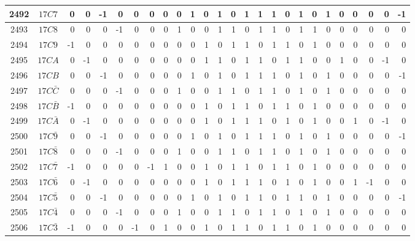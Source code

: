 \documentclass[12 pt]{article}%
\begin{document}
\begin{tiny}
\begin{centering}
\begin{longtable}{|c|c||rrrrrrrrrrrrrrrrrrrrrrrr|}
      \hline
      2492 & $17C7$ & 0 & 0 & -1 & 0 & 0 & 0 & 0 & 0 & 1 & 0 & 1 & 0 & 1 & 1 & 1 & 0 & 1 & 0 & 1 & 0 & 0 & 0 & 0 & -1 \\
      \hline
      2493 & $17C8$ & 0 & 0 & 0 & -1 & 0 & 0 & 0 & 1 & 0 & 0 & 1 & 1 & 0 & 1 & 1 & 0 & 1 & 1 & 0 & 0 & 0 & 0 & 0 & 0 \\
      \hline
      2494 & $17C9$ & -1 & 0 & 0 & 0 & 0 & 0 & 0 & 0 & 0 & 1 & 0 & 1 & 1 & 0 & 1 & 1 & 0 & 1 & 0 & 0 & 0 & 0 & 0 & 0 \\
      \hline
      2495 & $17CA$ & 0 & -1 & 0 & 0 & 0 & 0 & 0 & 0 & 0 & 1 & 1 & 0 & 1 & 1 & 0 & 1 & 1 & 0 & 0 & 1 & 0 & 0 & -1 & 0 \\
      \hline
      2496 & $17CB$ & 0 & 0 & -1 & 0 & 0 & 0 & 0 & 0 & 1 & 0 & 1 & 0 & 1 & 1 & 1 & 0 & 1 & 0 & 1 & 0 & 0 & 0 & 0 & -1 \\
      \hline
      2497 & $17C\bar C$ & 0 & 0 & 0 & -1 & 0 & 0 & 0 & 1 & 0 & 0 & 1 & 1 & 0 & 1 & 1 & 0 & 1 & 0 & 1 & 0 & 0 & 0 & 0 & 0 \\
      \hline
      2498 & $17C\bar B$ & -1 & 0 & 0 & 0 & 0 & 0 & 0 & 0 & 0 & 1 & 0 & 1 & 1 & 0 & 1 & 1 & 0 & 1 & 0 & 0 & 0 & 0 & 0 & 0 \\
      \hline
      2499 & $17C\bar A$ & 0 & -1 & 0 & 0 & 0 & 0 & 0 & 0 & 0 & 1 & 0 & 1 & 1 & 1 & 0 & 1 & 0 & 1 & 0 & 0 & 1 & 0 & -1 & 0 \\
      \hline
      2500 & $17C\bar9$ & 0 & 0 & -1 & 0 & 0 & 0 & 0 & 0 & 1 & 0 & 1 & 0 & 1 & 1 & 1 & 0 & 1 & 0 & 1 & 0 & 0 & 0 & 0 & -1 \\
      \hline
      2501 & $17C\bar8$ & 0 & 0 & 0 & -1 & 0 & 0 & 0 & 1 & 0 & 0 & 1 & 1 & 0 & 1 & 1 & 0 & 1 & 0 & 1 & 0 & 0 & 0 & 0 & 0 \\
      \hline
      2502 & $17C\bar7$ & -1 & 0 & 0 & 0 & 0 & -1 & 1 & 0 & 0 & 1 & 0 & 1 & 1 & 0 & 1 & 1 & 0 & 1 & 0 & 0 & 0 & 0 & 0 & 0 \\
      \hline
      2503 & $17C\bar6$ & 0 & -1 & 0 & 0 & 0 & 0 & 0 & 0 & 0 & 1 & 0 & 1 & 1 & 1 & 0 & 1 & 0 & 1 & 0 & 0 & 1 & -1 & 0 & 0 \\
      \hline
      2504 & $17C\bar5$ & 0 & 0 & -1 & 0 & 0 & 0 & 0 & 0 & 1 & 0 & 1 & 0 & 1 & 1 & 0 & 1 & 1 & 0 & 1 & 0 & 0 & 0 & 0 & -1 \\
      \hline
      2505 & $17C\bar4$ & 0 & 0 & 0 & -1 & 0 & 0 & 0 & 1 & 0 & 0 & 1 & 1 & 0 & 1 & 1 & 0 & 1 & 0 & 1 & 0 & 0 & 0 & 0 & 0 \\
      \hline
      2506 & $17C\bar3$ & -1 & 0 & 0 & 0 & -1 & 0 & 1 & 0 & 0 & 1 & 0 & 1 & 1 & 0 & 1 & 1 & 0 & 1 & 0 & 0 & 0 & 0 & 0 & 0 \\

\end{longtable}
\end{centering}
\end{tiny}
\end{document}

